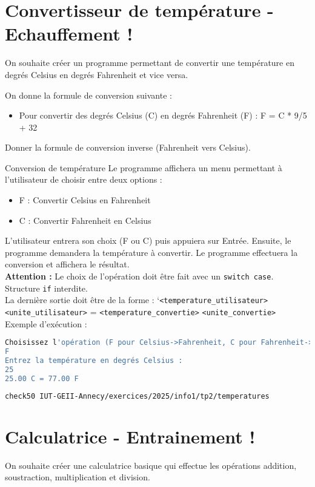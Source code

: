 


\section{Convertisseur de température - Echauffement !}
On souhaite créer un programme permettant de convertir une température en degrés Celsius en degrés Fahrenheit et vice versa.

On donne la formule de conversion suivante :
\begin{itemize}
	\item Pour convertir des degrés Celsius (C) en degrés Fahrenheit (F) : F = C * 9/5 + 32
\end{itemize}

Donner la formule de conversion inverse (Fahrenheit vers Celsius).

\begin{UPSTIManipulation}{Conversion de température}
	Le programme affichera un menu permettant à l'utilisateur de choisir entre deux options :
	\begin{itemize}
		\item F : Convertir Celsius en Fahrenheit
		\item C : Convertir Fahrenheit en Celsius
	\end{itemize}
	L'utilisateur entrera son choix (F ou C) puis appuiera sur Entrée. Ensuite, le programme demandera la température à convertir.
	Le programme effectuera la conversion et affichera le résultat.\\
	\textbf{Attention :} Le choix de l'opération doit être fait avec un \texttt{switch case}. Structure \texttt{if} interdite.\\
	La dernière sortie doit être de la forme :
	`\texttt{<temperature\_utilisateur>} \texttt{<unite\_utilisateur>} = \texttt{<temperature\_convertie>} \texttt{<unite\_convertie>}\\
	Exemple d'exécution :
	\begin{lstlisting}[language=bash,style=console]
Choisissez l'opération (F pour Celsius->Fahrenheit, C pour Fahrenheit->Celsius) :
F 
Entrez la température en degrés Celsius :
25
25.00 C = 77.00 F
\end{lstlisting}
\tcblower
\begin{lstlisting}[language=bash]
check50 IUT-GEII-Annecy/exercices/2025/info1/tp2/temperatures
\end{lstlisting}
\end{UPSTIManipulation}


\section{Calculatrice - Entrainement !}
On souhaite créer une calculatrice basique qui effectue les opérations addition, soustraction, multiplication et division.



